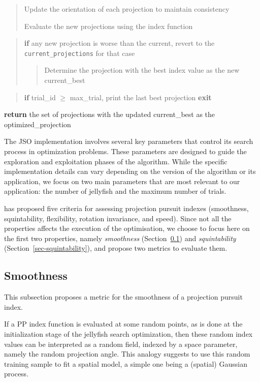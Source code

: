 \documentclass[
  number,
  preprint,
  3p]{elsarticle}
\begin{document}
\begin{tcolorbox}
\begin{quote}
Update the orientation of each projection to maintain consistency

Evaluate the new projections using the index function
\end{quote}

\begin{quote}
\textbf{if} any new projection is worse than the current, revert to the
\texttt{current\_projections} for that case

\begin{quote}
Determine the projection with the best index value as the new
current\_best
\end{quote}
\end{quote}

\begin{quote}
\textbf{if} trial\_id \(\geq\) max\_trial, print the last best
projection \textbf{exit}
\end{quote}

\textbf{return} the set of projections with the updated current\_best as
the optimized\_projection

\end{tcolorbox}

The JSO implementation involves several key parameters that control its
search process in optimization problems. These parameters are designed
to guide the exploration and exploitation phases of the algorithm. While
the specific implementation details can vary depending on the version of
the algorithm or its application, we focus on two main parameters that
are most relevant to our application: the number of jellyfish and the
maximum number of trials.

\citet{laa_using_2020} has proposed five criteria for assessing
projection pursuit indexes (smoothness, squintability, flexibility,
rotation invariance, and speed). Since not all the properties affects
the execution of the optimisation, we choose to focus here on the first
two properties, namely \emph{smoothness} (Section~\ref{sec-smoothness})
and \emph{squintability} (Section~\ref{sec-squintability}), and propose
two metrics to evaluate them.

\subsection{Smoothness}\label{sec-smoothness}

This subsection proposes a metric for the smoothness of a projection
pursuit index.

If a PP index function is evaluated at some random points, as is done at
the initialization stage of the jellyfish search optimization, then
these random index values can be interpreted as a random field, indexed
by a space parameter, namely the random projection angle. This analogy
suggests to use this random training sample to fit a spatial model, a
simple one being a (spatial) Gaussian process.
\end{document}
